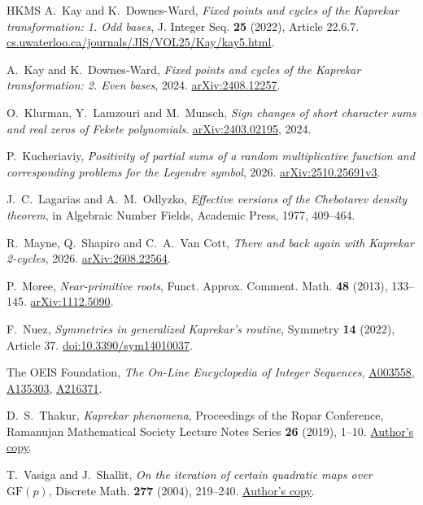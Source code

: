 \documentclass[11pt,reqno]{amsart}
\begin{document}
\begin{thebibliography}{HKMS}
A.~Kay and K.~Downes-Ward, \emph{Fixed points and cycles of the Kaprekar
transformation: 1. Odd bases}, J. Integer Seq. \textbf{25} (2022),
Article 22.6.7.
\href{https://cs.uwaterloo.ca/journals/JIS/VOL25/Kay/kay5.html}{cs.uwaterloo.ca/journals/JIS/VOL25/Kay/kay5.html}.

A.~Kay and K.~Downes-Ward, \emph{Fixed points and cycles of the Kaprekar
transformation: 2. Even bases}, 2024.
\href{https://arxiv.org/abs/2408.12257}{arXiv:2408.12257}.

O.~Klurman, Y.~Lamzouri and M.~Munsch, \emph{Sign changes of short character sums and real zeros of Fekete polynomials}.
\href{https://arxiv.org/abs/2403.02195}{arXiv:2403.02195}, 2024.

P.~Kucheriaviy, \emph{Positivity of partial sums of a random multiplicative function and corresponding problems for the Legendre symbol}, 2026.
\href{https://arxiv.org/abs/2510.25691v3}{arXiv:2510.25691v3}.

J.~C.~Lagarias and A.~M.~Odlyzko, \emph{Effective versions of the Chebotarev density theorem},
in Algebraic Number Fields, Academic Press, 1977, 409--464.

R.~Mayne, Q.~Shapiro and C.~A.~Van Cott, \emph{There and back again with Kaprekar 2-cycles}, 2026.
\href{https://arxiv.org/abs/2608.22564}{arXiv:2608.22564}.

P.~Moree, \emph{Near-primitive roots},
Funct. Approx. Comment. Math. \textbf{48} (2013), 133--145.
\href{https://arxiv.org/abs/1112.5090}{arXiv:1112.5090}.

F.~Nuez, \emph{Symmetries in generalized Kaprekar's routine},
Symmetry \textbf{14} (2022), Article 37.
\href{https://doi.org/10.3390/sym14010037}{doi:10.3390/sym14010037}.

The OEIS Foundation, \emph{The On-Line Encyclopedia of Integer Sequences},
\href{https://oeis.org/A003558}{A003558},
\href{https://oeis.org/A135303}{A135303},
\href{https://oeis.org/A216371}{A216371}.

D.~S.~Thakur, \emph{Kaprekar phenomena}, Proceedings of the Ropar Conference,
Ramanujan Mathematical Society Lecture Notes Series \textbf{26} (2019), 1--10.
\href{https://people.math.rochester.edu/faculty/dthakur2/kaprekar.pdf}{Author's copy}.

T.~Vasiga and J.~Shallit, \emph{On the iteration of certain quadratic maps over \(\mathrm{GF}(p)\)},
Discrete Math. \textbf{277} (2004), 219--240.
\href{https://cs.uwaterloo.ca/~tmjvasig/papers/newvasiga.pdf}{Author's copy}.


\end{thebibliography}
\end{document}
